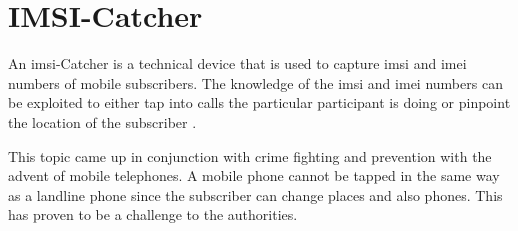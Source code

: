 \section{IMSI-Catcher}
\label{sec:catcher}
An \gls{imsi}-Catcher is a technical device that is used to capture \gls{imsi} and \gls{imei} numbers of mobile subscribers.
The knowledge of the \gls{imsi} and \gls{imei} numbers can be exploited to either tap into calls the particular participant is doing or pinpoint the location of the subscriber \cite{fox}.

This topic came up in conjunction with crime fighting and prevention with the advent of mobile telephones.
A mobile phone cannot be tapped in the same way as a landline phone since the subscriber can change places and also phones.
This has proven to be a challenge to the authorities.

